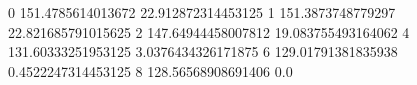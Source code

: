 0 151.4785614013672 22.912872314453125
1 151.3873748779297 22.821685791015625
2 147.64944458007812 19.083755493164062
4 131.60333251953125 3.0376434326171875
6 129.01791381835938 0.4522247314453125
8 128.56568908691406 0.0
